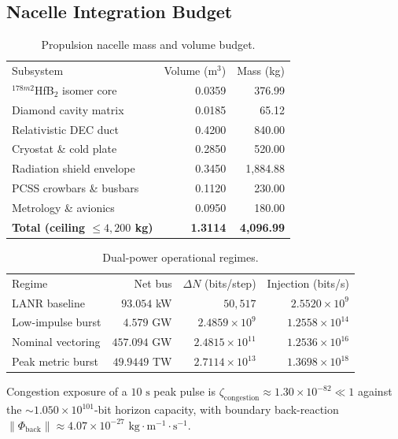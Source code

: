 \documentclass[twocolumn,aps,pra,floatfix,superscriptaddress,10pt]{revtex4-2}
\begin{document}
\subsection{Nacelle Integration Budget}

\begin{table}[!ht]
\caption{\label{tab:nacelle}Propulsion nacelle mass and volume budget.}
\begin{ruledtabular}
\begin{tabular}{lrr}
Subsystem & Volume (m$^3$) & Mass (kg) \\
\colrule
$^{178m2}$HfB$_2$ isomer core & 0.0359 & 376.99 \\
Diamond cavity matrix & 0.0185 & 65.12 \\
Relativistic DEC duct & 0.4200 & 840.00 \\
Cryostat \& cold plate & 0.2850 & 520.00 \\
Radiation shield envelope & 0.3450 & 1{,}884.88 \\
PCSS crowbars \& busbars & 0.1120 & 230.00 \\
Metrology \& avionics & 0.0950 & 180.00 \\
\colrule
\textbf{Total (ceiling $\le 4{,}200$ kg)} & \textbf{1.3114} & \textbf{4{,}096.99} \\
\end{tabular}
\end{ruledtabular}
\end{table}

\begin{table}[!ht]
\caption{\label{tab:regimes}Dual-power operational regimes.}
\begin{ruledtabular}
\begin{tabular}{lrrr}
Regime & Net bus & $\Delta N$ (bits/step) & Injection (bits/s) \\
\colrule
LANR baseline & $93.054$ kW & $50{,}517$ & $2.5520\times10^{9}$ \\
Low-impulse burst & $4.579$ GW & $2.4859\times10^{9}$ & $1.2558\times10^{14}$ \\
Nominal vectoring & $457.094$ GW & $2.4815\times10^{11}$ & $1.2536\times10^{16}$ \\
Peak metric burst & $49.9449$ TW & $2.7114\times10^{13}$ & $1.3698\times10^{18}$ \\
\end{tabular}
\end{ruledtabular}
\end{table}

Congestion exposure of a $10\text{ s}$ peak pulse is $\zeta_{\text{congestion}} \approx 1.30\times10^{-82} \ll 1$ against the $\sim 1.050\times10^{101}$-bit horizon capacity, with boundary back-reaction $\|\Phi_{\text{back}}\| \approx 4.07\times10^{-27}\text{ kg}\cdot\text{m}^{-1}\cdot\text{s}^{-1}$.
\end{document}
